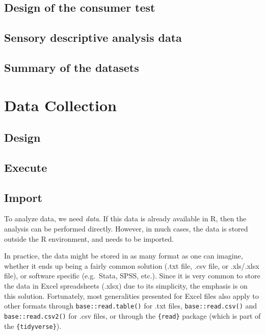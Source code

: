 \documentclass[
]{book}
\begin{document}
\hypertarget{design-of-the-consumer-test}{%
\section{Design of the consumer test}\label{design-of-the-consumer-test}}

\hypertarget{sensory-descriptive-analysis-data}{%
\section{Sensory descriptive analysis data}\label{sensory-descriptive-analysis-data}}

\hypertarget{summary-of-the-datasets}{%
\section{Summary of the datasets}\label{summary-of-the-datasets}}

\hypertarget{data-collection}{%
\chapter{Data Collection}\label{data-collection}}

\hypertarget{design-1}{%
\section{Design}\label{design-1}}

\hypertarget{execute-1}{%
\section{Execute}\label{execute-1}}

\hypertarget{import-1}{%
\section{Import}\label{import-1}}

To analyze data, we need \emph{data}. If this data is already available in R, then the analysis can be performed directly. However, in much cases, the data is stored outside the R environment, and needs to be imported.

In practice, the data might be stored in as many format as one can imagine, whether it ends up being a fairly common solution (.txt file, .csv file, or .xls/.xlsx file), or software specific (e.g.~Stata, SPSS, etc.).
Since it is very common to store the data in Excel spreadsheets (.xlsx) due to its simplicity, the emphasis is on this solution. Fortunately, most generalities presented for Excel files also apply to other formats through \texttt{base::read.table()} for .txt files, \texttt{base::read.csv()} and \texttt{base::read.csv2()} for .csv files, or through the \texttt{\{read\}} package (which is part of the \texttt{\{tidyverse\}}).
\end{document}
